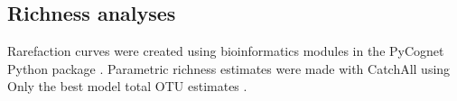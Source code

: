 \subsection{Richness analyses}
Rarefaction curves were created using bioinformatics modules in the PyCognet Python package \cite{Knight_2007}. Parametric richness estimates were made with CatchAll using Only the best model total OTU estimates \cite{BUNGE_2010}.













